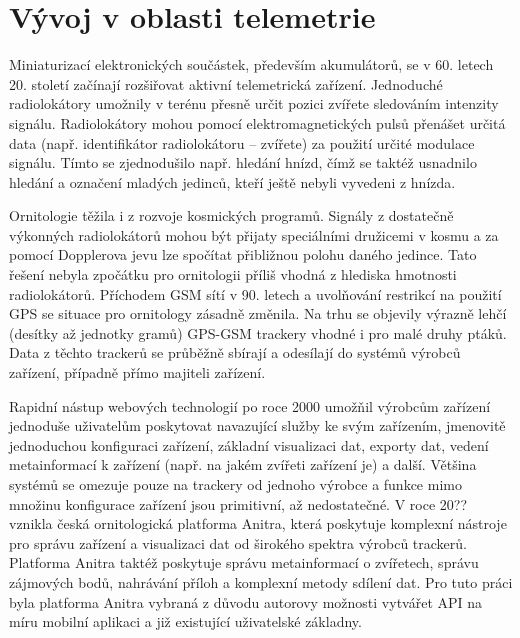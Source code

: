 \section{Vývoj v oblasti telemetrie}

Miniaturizací elektronických součástek, především akumulátorů, se v 60. letech 20. století začínají rozšiřovat aktivní telemetrická zařízení. Jednoduché radiolokátory umožnily v terénu přesně určit pozici zvířete sledováním intenzity signálu. Radiolokátory mohou pomocí elektromagnetických pulsů přenášet určitá data (např. identifikátor radiolokátoru -- zvířete) za použití určité modulace signálu. Tímto se zjednodušilo např. hledání hnízd, čímž se taktéž usnadnilo hledání a označení mladých jedinců, kteří ještě nebyli vyvedeni z hnízda.


Ornitologie těžila i z rozvoje kosmických programů. Signály z dostatečně výkonných radiolokátorů mohou být přijaty speciálními družicemi v kosmu a za pomocí Dopplerova jevu lze spočítat přibližnou polohu daného jedince. Tato řešení nebyla zpočátku pro ornitologii příliš vhodná z hlediska hmotnosti radiolokátorů. Příchodem GSM sítí v 90. letech a uvolňování restrikcí na použití GPS se situace pro ornitology zásadně změnila. Na trhu se objevily výrazně lehčí (desítky až jednotky gramů) GPS-GSM trackery vhodné i pro malé druhy ptáků. Data z těchto trackerů se průběžně sbírají a odesílají do systémů výrobců zařízení, případně přímo majiteli zařízení.

Rapidní nástup webových technologií po roce 2000 umožňil výrobcům zařízení jednoduše uživatelům poskytovat navazující služby ke svým zařízením, jmenovitě jednoduchou konfiguraci zařízení, základní visualizaci dat, exporty dat, vedení metainformací k zařízení (např. na jakém zvířeti zařízení je) a další. Většina systémů se omezuje pouze na trackery od jednoho výrobce a funkce mimo množinu konfigurace zařízení jsou primitivní, až nedostatečné. V roce 20?? vznikla česká ornitologická platforma Anitra, která poskytuje komplexní nástroje pro správu zařízení a visualizaci dat od širokého spektra výrobců trackerů. Platforma Anitra taktéž poskytuje správu metainformací o zvířetech, správu zájmových bodů, nahrávání příloh a komplexní metody sdílení dat. Pro tuto práci byla platforma Anitra vybraná z důvodu autorovy možnosti vytvářet API na míru mobilní aplikaci a již existující uživatelské základny.

